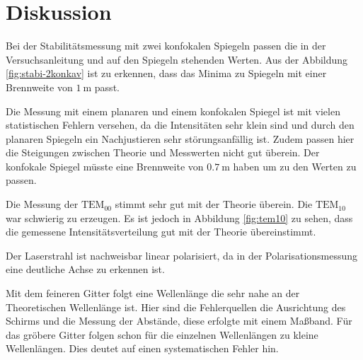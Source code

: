 \section{Diskussion}
\label{sec:Diskussion}
Bei der Stabilitätsmessung mit zwei konfokalen Spiegeln passen die in der Versuchsanleitung und auf den Spiegeln stehenden Werten.
Aus der Abbildung \ref{fig:stabi-2konkav} ist zu erkennen, dass das Minima zu Spiegeln mit einer Brennweite von $\SI{1}{\meter}$ passt.

Die Messung mit einem planaren und einem konfokalen Spiegel ist mit vielen statistischen Fehlern versehen,
da die Intensitäten sehr klein sind und durch den planaren Spiegeln ein Nachjustieren sehr störungsanfällig ist.
Zudem passen hier die Steigungen zwischen Theorie und Messwerten nicht gut überein.
Der konfokale Spiegel müsste eine Brennweite von $\SI{0.7}{\meter}$ haben um zu den Werten zu passen.

Die Messung der $\text{TEM}_{00}$ stimmt sehr gut mit der Theorie überein.
Die $\text{TEM}_{10}$ war schwierig zu erzeugen.
Es ist jedoch in Abbildung \ref{fig:tem10} zu sehen,
dass die gemessene Intensitätsverteilung gut mit der Theorie übereinstimmt.

Der Laserstrahl ist nachweisbar linear polarisiert, da in der Polarisationsmessung eine deutliche Achse zu erkennen ist.

Mit dem feineren Gitter folgt eine Wellenlänge die sehr nahe an der Theoretischen Wellenlänge ist.
Hier sind die Fehlerquellen die Ausrichtung des Schirms und die Messung der Abstände, diese erfolgte mit einem Maßband.
Für das gröbere Gitter folgen schon für die einzelnen Wellenlängen zu kleine Wellenlängen.
Dies deutet auf einen systematischen Fehler hin.
